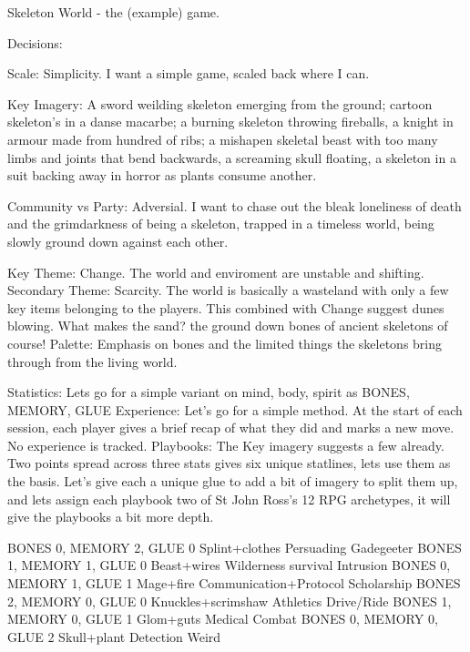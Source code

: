 Skeleton World - the (example) game.



Decisions:

Scale: Simplicity. I want a simple game, scaled back where I can. 

Key Imagery: A sword weilding skeleton emerging from the ground; cartoon skeleton's in a danse macarbe; a burning skeleton throwing fireballs, a knight in armour made from hundred of ribs; a mishapen skeletal beast with too many limbs and joints that bend backwards, a screaming skull floating, a skeleton in a suit backing away in horror as plants consume another.

Community vs Party: Adversial. I want to chase out the bleak loneliness of death and the grimdarkness of being a skeleton, trapped in a timeless world, being slowly ground down against each other.  

Key Theme: Change. The world and enviroment are unstable and shifting. 
Secondary Theme: Scarcity. The world is basically a wasteland with only a few key items belonging to the players. This combined with Change suggest dunes blowing. What makes the sand? the ground down bones of ancient skeletons of course!
Palette: Emphasis on bones and the limited things the skeletons bring through from the living world.

Statistics: Lets go for a simple variant on mind, body, spirit as BONES, MEMORY, GLUE
Experience: Let's go for a simple method. At the start of each session, each player gives a brief recap of what they did and marks a new move. No experience is tracked.
Playbooks: The Key imagery suggests a few already. Two points spread across three stats gives six unique statlines, lets use them as the basis. Let's give each a unique glue to add a bit of imagery to split them up, and lets assign each playbook two of St John Ross's 12 RPG archetypes, it will give the playbooks a bit more depth.

BONES 0, MEMORY 2, GLUE 0  Splint+clothes  		Persuading					Gadegeeter
BONES 1, MEMORY 1, GLUE 0  Beast+wires			Wilderness survival		Intrusion
BONES 0, MEMORY 1, GLUE 1  Mage+fire				Communication+Protocol	Scholarship
BONES 2, MEMORY 0, GLUE 0  Knuckles+scrimshaw  Athletics					Drive/Ride
BONES 1, MEMORY 0, GLUE 1  Glom+guts				Medical						Combat
BONES 0, MEMORY 0, GLUE 2  Skull+plant				Detection					Weird


